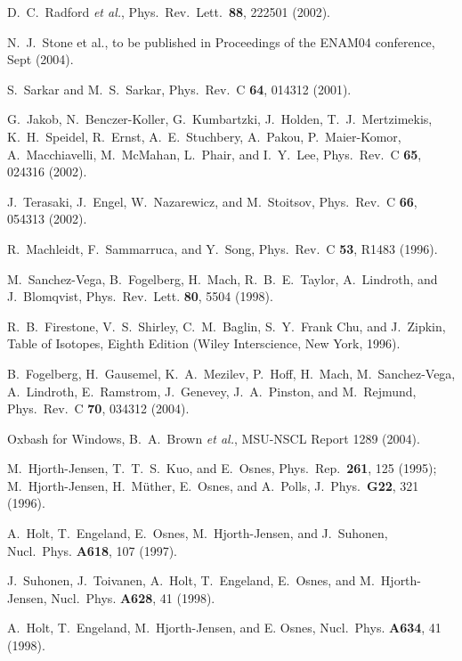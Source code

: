 \documentclass[aps,twocolumn,superscriptaddress,prc,showpacs]{revtex4}
\begin{document}
\begin{thebibliography}{9}
     D.~C.~Radford {\em et al.}, Phys.~Rev.~Lett.~{\bf 88}, 222501 (2002). 

     N.~J.~Stone et al., to be published in Proceedings of the ENAM04 conference, Sept (2004).

     S.~Sarkar and M.~S.~Sarkar, Phys.~Rev.~C {\bf 64}, 014312 (2001). 


     G.~Jakob, N.~Benczer-Koller, G.~Kumbartzki, J.~Holden, T.~J.~Mertzimekis,
 K.~H.~Speidel, R.~Ernst, A.~E.~Stuchbery, A.~Pakou, P.~Maier-Komor,
A.~Macchiavelli, M.~McMahan, L.~Phair, and I.~Y.~Lee, Phys.~Rev.~C {\bf{65}}, 024316 (2002).   

     J.~Terasaki, J.~Engel, W.~Nazarewicz, and M.~Stoitsov, Phys.~Rev.~C {\bf 66}, 054313 (2002). 

     R.~Machleidt, F.\ Sammarruca, and Y.\ Song,
     Phys.\ Rev.\ C {\bf 53}, R1483 (1996).

M.~Sanchez-Vega, B.~Fogelberg, H.~Mach, R.~B.~E.~Taylor,
     A.~Lindroth, and J.~Blomqvist, Phys.~Rev.~Lett. {\bf 80}, 5504 (1998). 

R.~B.~Firestone, V.~S.~Shirley, C.~M.~Baglin, S.~Y.~Frank Chu,
     and J.~Zipkin, Table of Isotopes, Eighth Edition
     (Wiley Interscience, New York, 1996).   

 B.~Fogelberg, H.~Gausemel, K.~A.~Mezilev,
     P.~Hoff, H.~Mach, M.~Sanchez-Vega, A.~Lindroth, E.~Ramstrom,
     J.~Genevey, J.~A.~Pinston, and M.~Rejmund,
     Phys.~Rev.~C {\bf 70}, 034312 (2004).  

 Oxbash for Windows, B.~A.~Brown {\em et al.},
     MSU-NSCL Report 1289 (2004).


     M.\ Hjorth-Jensen, T.\ T.\ S.\ Kuo, and
     E.\ Osnes, Phys.\ Rep.~{\bf 261}, 125 (1995);
     M.\ Hjorth-Jensen, H.\ M\"uther, E.\ Osnes, and A.\ Polls,
     J.\ Phys.\ {\bf G22}, 321 (1996).

     A.~Holt, T.~Engeland, E.~Osnes, M.~Hjorth-Jensen, and J.~Suhonen,
     Nucl.~Phys. {\bf A618}, 107 (1997).

     J.~Suhonen, J.~Toivanen, A.~Holt, T.~Engeland, E.~Osnes, and
     M.~Hjorth-Jensen, Nucl.~Phys. {\bf A628}, 41  (1998).

     A.~Holt, T.~Engeland, M.~Hjorth-Jensen, and E. Osnes,
     Nucl.~Phys. {\bf A634}, 41 (1998).


\end{thebibliography}
\end{document}
